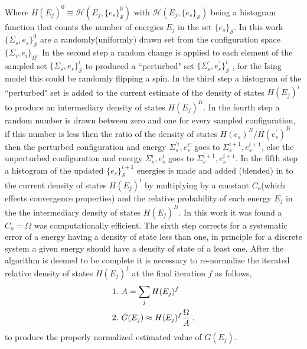 \documentclass[aps,prl,reprint,superscriptaddress,showkeys]{revtex4-1}
\begin{document}
Where  $H(E_j)^0 \equiv \mathcal{H}(E_j,\{e_s\}_{\mathcal{S}}^0)$ with $\mathcal{H}(E_j,\{e_s\}_{\mathcal{S}})$ being a histogram function that counts the number of energies $E_j$ in the set $\{e_s\}_{\mathcal{S}}$. In this work $\{\Sigma_{s},e_s\}_{\mathcal{S}}^0$  are a randomly(uniformly) drawn set from the configuration space $\{ \Sigma_i, e_i \}_\Omega $. In the second step  a random change is applied to each element of the sampled set $\{\Sigma_{s},e_s\}_{\mathcal{S}}^i$ to produced a ``perturbed" set $ \{\Sigma_{s}^{'},e_s^{'}\}_{\mathcal{S}}^i$ , for the Ising model this could be randomly flipping a spin. In the third step a histogram of the ``perturbed" set is added to the current estimate of the density of states $H(E_j)^i$ to produce an intermediary density of states $H(E_j)^{Ii}$. In the fourth step a random number is drawn between zero and one for every sampled configuration, if this number is less then the ratio of the density of states $H(e_s)^{Ii}/H(e_s^{'})^{Ii}$ then the perturbed configuration and energy  $\Sigma_{s}^{'i},e_s^{i'}$  goes to $\Sigma_{s}^{i+1},e_s^{i+1}$,  else the unperturbed configuration and energy $\Sigma_{s}^{i},e_s^i$  goes to $\Sigma_{s}^{i+1},e_s^{i+1}$. In the fifth step a histogram of the updated $\{ e_s \}^{i+1}_{\mathcal{S}}$ energies is made and added (blended) in to the current density of states $H(E_j)^i$   by multiplying  by a constant $C_{o}$(which effects convergence properties) and the relative probability of each energy $E_j$ in the the intermediary density of states $H(E_j)^{Ii}$. In this work it was found a $C_{o}=\Omega$ was computationally efficient. The sixth step corrects for a systematic error of a energy having a density of state less than one, in principle for a discrete system a given energy should have a density of state of a least one.  After the algorithm is deemed to be complete it is necessary to re-normalize the iterated relative density of states $H(E_j)^f$ at the final iteration $f$ as follows, 
\begin{equation}
\begin{split}
&1. \hspace{0.125cm} A = \sum_jH(E_j)^f\\
&2. \hspace{0.125cm} G(E_j)\approx H(E_j)^f \frac{\Omega}{A} \;,
\end{split}
\end{equation}
to produce the properly normalized estimated value of $G(E_j)$. 
\end{document}
